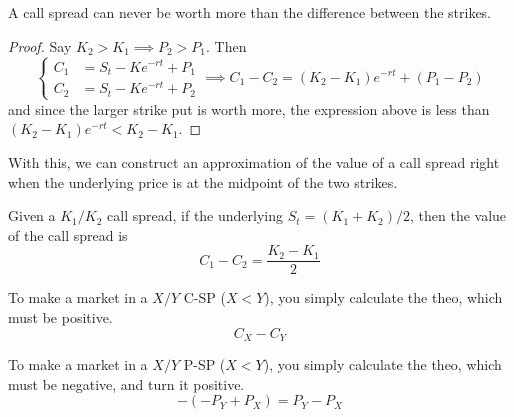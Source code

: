 \documentclass{article}
\begin{document}
    \begin{theorem}
      \label{thm:upper-bound-on-value-call-spread}
      A call spread can never be worth more than the difference between the strikes. 
    \end{theorem}
    \begin{proof}
      Say $K_2 > K_1 \implies P_2 > P_1$. Then 
      \begin{equation}
        \begin{cases}  C_1 & = S_t - K e^{-rt} + P_1 \\ C_2 & = S_t - K e^{-rt} + P_2 \end{cases} \implies C_1 - C_2 = (K_2 - K_1) e^{-rt} + (P_1 - P_2) 
      \end{equation}
      and since the larger strike put is worth more, the expression above is less than $(K_2 - K_1) e^{-rt} < K_2 - K_1$. 
    \end{proof}

    With this, we can construct an approximation of the value of a call spread right when the underlying price is at the midpoint of the two strikes. 

    \begin{corollary}
      \label{thm:call-spread-value-at-midpoint}
      Given a $K_1/K_2$ call spread, if the underlying $S_t = (K_1 + K_2)/2$, then the value of the call spread is 
      \begin{equation}
        C_1 - C_2  = \frac{K_2 - K_1}{2}
      \end{equation}
    \end{corollary}

    \begin{example}
      \label{ex:c-sp-market-making}
      To make a market in a $X/Y$ C-SP ($X < Y$), you simply calculate the theo, which must be positive.
      \begin{equation}
        C_X - C_Y
      \end{equation}
    \end{example}

    \begin{example}
      \label{ex:p-sp-market-making}
      To make a market in a $X/Y$ P-SP ($X < Y$), you simply calculate the theo, which must be negative, and turn it positive.
      \begin{equation}
        -(-P_Y + P_X) = P_Y - P_X
      \end{equation}
    \end{example}
\end{document}
